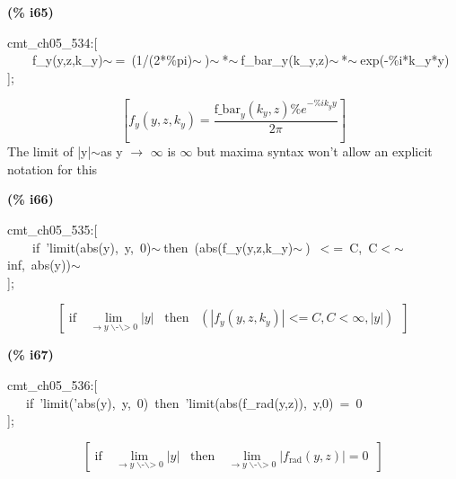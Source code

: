 \documentclass[fleqn]{article}
\begin{document}
\noindent
\begin{minipage}[t]{4.000000em}\color{red}\bfseries
(\% i65)	
\end{minipage}
\begin{minipage}[t]{\textwidth}\color{blue}
cmt\_ch05\_534:[\\
\ \ \ \ f\_y(y,z,k\_y)\ensuremath{\sim\ }=\ (1/(2*\%pi)\ensuremath{\sim\ })\ensuremath{\sim\ }*\ensuremath{\sim\ }f\_bar\_y(k\_y,z)\ensuremath{\sim\ }*\ensuremath{\sim\ }exp(-\%i*k\_y*y)\\
];
\end{minipage}
\[\displaystyle \tag{\% o65} 
\left[ {f_y}\left( y\operatorname{,}z\operatorname{,}{k_y}\right) =\frac{{{\ensuremath{\mathrm{f\_ bar}}}_y}\left( {k_y}\operatorname{,}z\right)  {{\% e}^{-\% i {k_y} y}}}{2 \ensuremath{\pi} }\right] \mbox{}
\]
The limit of |y|\ensuremath{\sim }as y \ensuremath{\longrightarrow} \ensuremath{\infty} is \ensuremath{\infty} but maxima syntax won't allow an explicit notation for this


\noindent
\begin{minipage}[t]{4.000000em}\color{red}\bfseries
(\% i66)	
\end{minipage}
\begin{minipage}[t]{\textwidth}\color{blue}
cmt\_ch05\_535:[\\
\ \ \ \ if\ 'limit(abs(y),\ y,\ 0)\ensuremath{\sim\ }then\ (abs(f\_y(y,z,k\_y)\ensuremath{\sim\ })\ \ensuremath{<}=\ C,\ C\ensuremath{<}\ensuremath{\sim\ }inf,\ abs(y))\ensuremath{\sim\ }\\
];
\end{minipage}
\[\displaystyle \tag{\% o66} 
\left[ \operatorname{if}\operatorname{ }\lim_{\to y\operatorname{\backslash -\backslash >  }0}{\left| y\right| }\operatorname{ }\operatorname{then}\operatorname{ }\left( \left| {f_y}\left( y\operatorname{,}z\operatorname{,}{k_y}\right) \right| \operatorname{<  =}C\operatorname{,}C\operatorname{<  }\infty \operatorname{,}\left| y\right| \right) \operatorname{ }\right] \mbox{}
\]


\noindent
\begin{minipage}[t]{4.000000em}\color{red}\bfseries
(\% i67)	
\end{minipage}
\begin{minipage}[t]{\textwidth}\color{blue}
cmt\_ch05\_536:[\\
\ \ \ if\ 'limit('abs(y),\ y,\ 0)\ then\ 'limit(abs(f\_rad(y,z)),\ y,0)\ =\ 0\\
];
\end{minipage}
\[\displaystyle \tag{\% o67} 
\left[ \operatorname{if}\operatorname{ }\lim_{\to y\operatorname{\backslash -\backslash >  }0}{\left| y\right| }\operatorname{ }\operatorname{then}\operatorname{ }\lim_{\to y\operatorname{\backslash -\backslash >  }0}{\left| {f_{\ensuremath{\mathrm{rad}}}}\left( y\operatorname{,}z\right) \right| }=0\operatorname{ }\right] \mbox{}
\]
\end{document}
